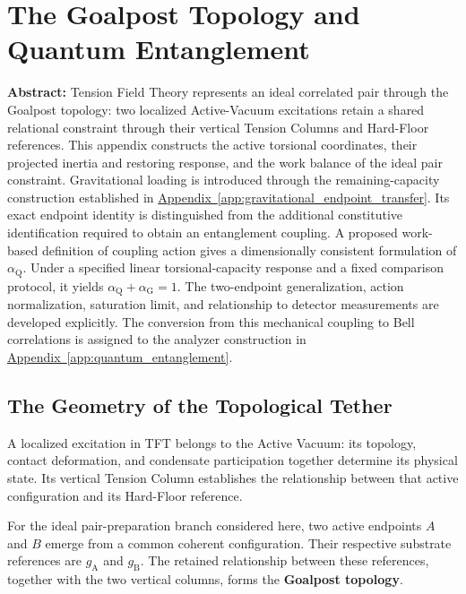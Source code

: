 \chapter{The Goalpost Topology and Quantum Entanglement}
\label{app:entanglement}

\noindent\textbf{Abstract:}
Tension Field Theory represents an ideal correlated pair through the Goalpost topology: two localized Active-Vacuum excitations retain a shared relational constraint through their vertical Tension Columns and Hard-Floor references. This appendix constructs the active torsional coordinates, their projected inertia and restoring response, and the work balance of the ideal pair constraint. Gravitational loading is introduced through the remaining-capacity construction established in \hyperref[app:gravitational_endpoint_transfer]{Appendix~\ref*{app:gravitational_endpoint_transfer}}. Its exact endpoint identity is distinguished from the additional constitutive identification required to obtain an entanglement coupling. A proposed work-based definition of coupling action gives a dimensionally consistent formulation of $\alpha_{\mathrm Q}$. Under a specified linear torsional-capacity response and a fixed comparison protocol, it yields $\alpha_{\mathrm Q}+\alpha_{\mathrm G}=1$. The two-endpoint generalization, action normalization, saturation limit, and relationship to detector measurements are developed explicitly. The conversion from this mechanical coupling to Bell correlations is assigned to the analyzer construction in \hyperref[app:quantum_entanglement]{Appendix~\ref*{app:quantum_entanglement}}.

\section{The Geometry of the Topological Tether}

A localized excitation in TFT belongs to the Active Vacuum: its topology, contact deformation, and condensate participation together determine its physical state. Its vertical Tension Column establishes the relationship between that active configuration and its Hard-Floor reference.

For the ideal pair-preparation branch considered here, two active endpoints $A$ and $B$ emerge from a common coherent configuration. Their respective substrate references are $g_{\mathrm A}$ and $g_{\mathrm B}$. The retained relationship between these references, together with the two vertical columns, forms the \textbf{Goalpost topology}.

